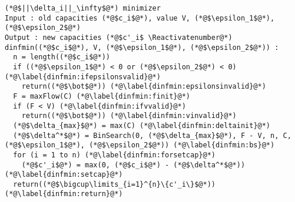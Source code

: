 \Suppressnumber
\begin{lstlisting}[label=dinf, style=numbers]
(*@$||\delta_i||_\infty$@*) minimizer
Input : old capacities (*@$c_i$@*), value V, (*@$\epsilon_1$@*), (*@$\epsilon_2$@*)
Output : new capacities (*@$c'_i$ \Reactivatenumber@*)
dinfmin((*@$c_i$@*), V, (*@$\epsilon_1$@*), (*@$\epsilon_2$@*)) :
  n = length((*@$c_i$@*))
  if ((*@$\epsilon_1$@*) < 0 or (*@$\epsilon_2$@*) < 0) (*@\label{dinfmin:ifepsilonsvalid}@*)
    return((*@$\bot$@*)) (*@\label{dinfmin:epsilonsinvalid}@*)
  F = maxFlow(C) (*@\label{dinfmin:finit}@*)
  if (F < V) (*@\label{dinfmin:ifvvalid}@*)
    return((*@$\bot$@*)) (*@\label{dinfmin:vinvalid}@*)
  (*@$\delta_{max}$@*) = max(C) (*@\label{dinfmin:deltainit}@*)
  (*@$\delta^*$@*) = BinSearch(0, (*@$\delta_{max}$@*), F - V, n, C, (*@$\epsilon_1$@*), (*@$\epsilon_2$@*)) (*@\label{dinfmin:bs}@*)
  for (i = 1 to n) (*@\label{dinfmin:forsetcap}@*)
    (*@$c'_i$@*) = max(0, (*@$c_i$@*) - (*@$\delta^*$@*)) (*@\label{dinfmin:setcap}@*)
  return((*@$\bigcup\limits_{i=1}^{n}\{c'_i\}$@*)) (*@\label{dinfmin:return}@*)
\end{lstlisting}
